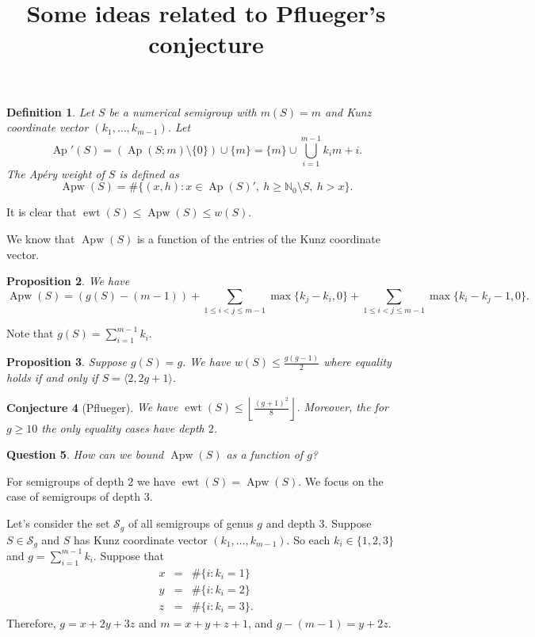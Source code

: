 \documentclass{amsart}
\title{Some ideas related to Pflueger's conjecture}
\DeclareMathOperator{\Ap}{Ap}
\DeclareMathOperator{\Apw}{Apw}
\DeclareMathOperator{\ewt}{ewt}
\newcommand{\N}{{\mathbb N}}
\theoremstyle{plain}\newtheorem{proposition}{Proposition}[section]
\newtheorem{defn}[proposition]{Definition}
\newtheorem{conj}[proposition]{Conjecture}
\newtheorem{question}[proposition]{Question}
\newtheorem{prop}[proposition]{Proposition}
\theoremstyle{remark}\newtheorem{example}[proposition]{Example}
\begin{document}
\maketitle

\begin{defn}
Let $S$ be a numerical semigroup with $m(S) = m$ and Kunz coordinate vector $(k_1,\ldots, k_{m-1})$.  Let 
\[
\Ap'(S) = (\Ap(S;m) \setminus \{0\})\cup\{m\} = \{m\} \cup \bigcup_{i=1}^{m-1} k_i m + i.
\]
The Ap\'ery weight of $S$ is defined as
\[
\Apw(S) = \#\{(x,h)\colon x \in \Ap(S)',\ h \ge \N_0\setminus S,\ h > x\}.
\]
\end{defn}
It is clear that $\ewt(S) \le \Apw(S) \le w(S)$.

We know that $\Apw(S)$ is a function of the entries of the Kunz coordinate vector.
\begin{prop}\label{Apw_prop}
We have 
\[
\Apw(S) = (g(S)-(m-1)) + \sum_{1 \le i < j \le m-1} \max\{k_j - k_i, 0\} +  \sum_{1 \le i < j \le m-1} \max\{k_i - k_j - 1, 0\}.
\]
\end{prop}
Note that $g(S) = \sum_{i=1}^{m-1} k_i$.


\begin{prop}
Suppose $g(S) = g$.  We have $w(S) \le \frac{g(g-1)}{2}$ where equality holds if and only if $S = \langle 2,2g+1\rangle$.
\end{prop}

\begin{conj}[Pflueger]
We have $\ewt(S) \le \left\lfloor \frac{(g+1)^2}{8} \right\rfloor$.  Moreover, the for $g \ge 10$ the only equality cases have depth $2$.
\end{conj}

\begin{question}
How can we bound $\Apw(S)$ as a function of $g$?
\end{question}
For semigroups of depth $2$ we have $\ewt(S) = \Apw(S)$.  We focus on the case of semigroups of depth $3$.

Let's consider the set $\mathcal{S}_g$ of all semigroups of genus $g$ and depth $3$.  Suppose $S \in \mathcal{S}_g$ and $S$ has Kunz coordinate vector $(k_1,\ldots, k_{m-1})$.  So each $k_i \in \{1,2,3\}$ and $g = \sum_{i=1}^{m-1} k_i$.  Suppose that 
\begin{eqnarray*}
x & = & \#\{i\colon k_i = 1\}\\
y & = &  \#\{i\colon k_i = 2\}\\
 z & = & \#\{i\colon k_i = 3\}.
\end{eqnarray*}
Therefore, $g = x+2y+3z$ and $m = x+y+z+1$, and $g-(m-1) = y+2z$.
\end{document}

